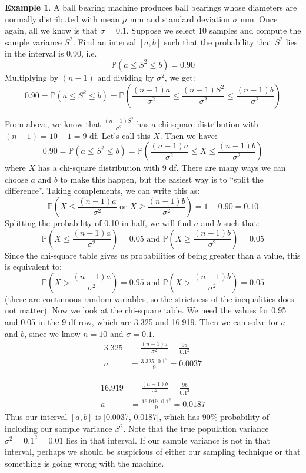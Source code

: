 \documentclass[12pt]{article}
\theoremstyle{definition}
\newtheorem*{example}{Example}
\theoremstyle{remark}
\def\P{{\mathbb P}}
\begin{document}
\begin{example}A ball bearing machine produces ball bearings whose diameters are normally distributed with mean $
\mu$ mm and standard deviation $\sigma$ mm. Once again, all we know is that $\sigma = 0.1$. Suppose we select 10 samples and compute the sample variance $S^2$. Find an interval $[a, b]$ such that the probability that $S^2$ lies in the interval is 0.90, i.e.
\[
\P(a \leq S^2 \leq b) = 0.90
\]
Multiplying by $(n - 1)$ and dividing by $\sigma^2$, we get:
\[
0.90 = \P(a \leq S^2 \leq b) = \P \left( \frac{(n-1)a}{\sigma^2} \leq \frac{(n-1)S^2}{\sigma^2} \leq \frac{(n-1)b}{\sigma^2} \right)
\]
\end{example}
From above, we know that $\frac{(n-1)S^2}{\sigma^2}$ has a chi-square distribution with $(n - 1) = 10 - 1 = 9$ df. Let's call this $X$. Then we have:
\[
0.90 = \P(a \leq S^2 \leq b) = \P \left( \frac{(n-1)a}{\sigma^2} \leq X \leq \frac{(n-1)b}{\sigma^2} \right)
\]
where $X$ has a chi-square distribution with 9 df. There are many ways we can choose $a$ and $b$ to make this happen, but the easiest way is to ``split the difference''. Taking complements, we can write this as:
\[
\P \left( X \leq \frac{(n-1)a}{\sigma^2} \text{ or } X \geq \frac{(n-1)b}{\sigma^2} \right) = 1 - 0.90 = 0.10
\]
Splitting the probability of 0.10 in half, we will find $a$ and $b$ such that:
\[
\P \left( X \leq \frac{(n-1)a}{\sigma^2} \right) = 0.05 \text{ and } \P \left( X \geq \frac{(n-1)b}{\sigma^2} \right) = 0.05
\]
Since the chi-square table gives us probabilities of being greater than a value, this is equivalent to:
\[
\P \left( X > \frac{(n-1)a}{\sigma^2} \right) = 0.95 \text{ and } \P \left( X > \frac{(n-1)b}{\sigma^2} \right) = 0.05
\]
(these are continuous random variables, so the strictness of the inequalities does not matter). Now we look at the chi-square table. We need the values for 0.95 and 0.05 in the 9 df row, which are 3.325 and 16.919. Then we can solve for $a$ and $b$, since we know $n = 10$ and $\sigma = 0.1$.
\begin{align*}
3.325 &= \frac{(n-1)a}{\sigma^2} = \frac{9a}{0.1^2} \\
a &= \frac{3.325 \cdot 0.1^2}{9} = 0.0037
\end{align*}

\begin{align*}
16.919 &= \frac{(n-1)b}{\sigma^2} = \frac{9b}{0.1^2} \\
a &= \frac{16.919 \cdot 0.1^2}{9} = 0.0187
\end{align*}
Thus our interval $[a, b]$ is [0.0037, 0.0187], which has 90\% probability of including our sample variance $S^2$. Note that the true population variance $\sigma^2 = 0.1^2 = 0.01$ lies in that interval. If our sample variance is not in that interval, perhaps we should be suspicious of either our sampling technique or that something is going wrong with the machine.\\
\end{document}
